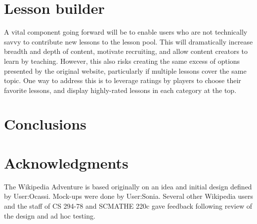 \documentclass{acm_proc_article-sp}
\begin{document}
\section{Lesson builder}

A vital component going forward will be to enable users who are not technically savvy to contribute new lessons to the lesson pool. This will dramatically increase breadth and depth of content, motivate recruiting, and allow content creators to learn by teaching. However, this also risks creating the same excess of options presented by the original website, particularly if multiple lessons cover the same topic. One way to address this is to leverage ratings by players to choose their favorite lessons, and display highly-rated lessons in each category at the top.

\section{Conclusions}

\section{Acknowledgments}
The Wikipedia Adventure is based originally on an idea and
initial design defined by User:Ocassi. Mock-ups
were done by User:Sonia. Several
other Wikipedia users and the staff of
CS 294-78 and SCMATHE 220c gave feedback following
review of the design and ad hoc testing.


\end{document}
